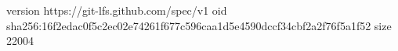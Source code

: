 version https://git-lfs.github.com/spec/v1
oid sha256:16f2edac0f5c2ec02e74261f677c596caa1d5e4590dccf34cbf2a2f76f5a1f52
size 22004
